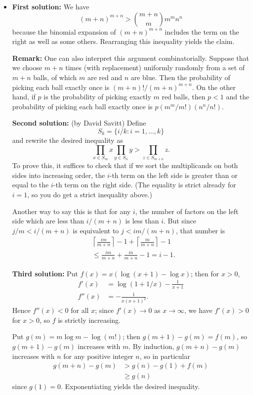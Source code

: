 \documentclass[amssymb,twocolumn,pra,10pt,aps]{revtex4-1}
\begin{document}
\begin{itemize}
\item[B2]
\textbf{First solution:}
We have
\[
(m+n)^{m+n} > \binom{m+n}{m} m^m n^n
\]
because the binomial expansion of $(m+n)^{m+n}$ includes the term on
the right as well as some others. Rearranging this inequality yields
the claim.

\textbf{Remark:}
One can also interpret this argument combinatorially.
Suppose that we choose $m+n$ times (with replacement) uniformly
randomly from a set of $m+n$ balls, of which $m$ are red and $n$ are
blue. Then the probability of picking each ball exactly once is
$(m+n)!/(m+n)^{m+n}$. On the other hand, if $p$ is the probability
of picking exactly $m$ red balls, then $p<1$ and the probability
of picking each ball exactly once is $p (m^m/m!)(n^n/n!)$.

\textbf{Second solution:} (by David Savitt)
Define
\[
S_k = \{i/k: i=1, \dots, k\}
\]
and rewrite the desired inequality as
\[
\prod_{x \in S_m} x \prod_{y \in S_n} y > \prod_{z \in S_{m+n}} z.
\]
To prove this, it suffices to check that if we sort the multiplicands
on both sides into increasing order, the $i$-th term on the left
side is greater than or equal to the $i$-th term on the right side.
(The equality is strict already for $i=1$, so you do get a strict inequality
above.)

Another way to say this is that for
any $i$, the number of factors on the left side which are less than
$i/(m+n)$ is less than $i$. But since $j/m < i/(m+n)$ is equivalent to
$j < im/(m+n)$, that number is
\begin{align*}
&\left\lceil \frac{im}{m+n} \right\rceil -1 +
\left\lceil \frac{in}{m+n} \right\rceil -1 \\
&\leq \frac{im}{m+n} + \frac{in}{m+n} - 1 = i-1.
\end{align*}

\textbf{Third solution:}
Put $f(x) = x (\log (x+1) - \log x)$; then for $x>0$,
\begin{align*}
f'(x) &= \log(1 + 1/x) - \frac{1}{x+1} \\
f''(x) &= - \frac{1}{x(x+1)^2}.
\end{align*}
Hence $f''(x) < 0$ for all $x$; since $f'(x) \to 0$ as $x \to \infty$,
we have $f'(x) > 0$ for $x>0$, so $f$ is strictly increasing.

Put $g(m) = m \log m - \log(m!)$; then $g(m+1) - g(m) = f(m)$,
so $g(m+1)-g(m)$ increases with $m$. By induction,
$g(m+n) - g(m)$ increases with $n$ for any positive integer $n$,
so in particular
\begin{align*}
g(m+n) - g(m) &> g(n) - g(1) + f(m) \\
&\geq g(n)
\end{align*}
since $g(1) = 0$. Exponentiating yields the desired inequality.


\end{itemize}
\end{document}
